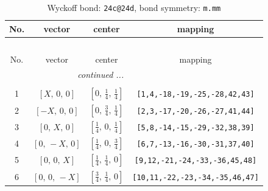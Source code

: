 \documentclass[fleqn,8pt]{jsarticle}
\begin{document}
\begin{longtable}{cccc}
\caption{Wyckoff bond: {\tt 24c@24d}, bond symmetry: {\tt m.mm}}
 \\
 \hline \hline
No. & vector & center & mapping \\ \hline \endfirsthead

\multicolumn{3}{l}{\tablename\ \thetable{}} \\
 \hline \hline
No. & vector & center & mapping \\ \hline \endhead

 \hline \hline
\multicolumn{3}{r}{\footnotesize\it continued ...} \\ \endfoot

 \hline \hline
\multicolumn{3}{r}{} \\ \endlastfoot

1 & $\left[ X,\, 0,\, 0 \right]$ & $\left[ 0,\, \frac{1}{4},\, \frac{1}{4} \right]$ & {\tt [1,4,-18,-19,-25,-28,42,43]} \\ \hline
2 & $\left[ - X,\, 0,\, 0 \right]$ & $\left[ 0,\, \frac{3}{4},\, \frac{1}{4} \right]$ & {\tt [2,3,-17,-20,-26,-27,41,44]} \\ \hline
3 & $\left[ 0,\, X,\, 0 \right]$ & $\left[ \frac{1}{4},\, 0,\, \frac{1}{4} \right]$ & {\tt [5,8,-14,-15,-29,-32,38,39]} \\ \hline
4 & $\left[ 0,\, - X,\, 0 \right]$ & $\left[ \frac{1}{4},\, 0,\, \frac{3}{4} \right]$ & {\tt [6,7,-13,-16,-30,-31,37,40]} \\ \hline
5 & $\left[ 0,\, 0,\, X \right]$ & $\left[ \frac{1}{4},\, \frac{1}{4},\, 0 \right]$ & {\tt [9,12,-21,-24,-33,-36,45,48]} \\ \hline
6 & $\left[ 0,\, 0,\, - X \right]$ & $\left[ \frac{3}{4},\, \frac{1}{4},\, 0 \right]$ & {\tt [10,11,-22,-23,-34,-35,46,47]} \\
\end{longtable}
\renewcommand{\arraystretch}{1.2}
\end{document}
